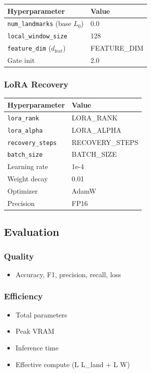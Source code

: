 \begin{table}[H]
\centering
\small
\begin{tabular}{ll}
\toprule
\textbf{Hyperparameter} & \textbf{Value} \\
\midrule
\texttt{num\_landmarks} (base $L_0$) & 0.0 \\
\texttt{local\_window\_size} & 128 \\
\texttt{feature\_dim} ($d_\text{feat}$) & {{FEATURE\_DIM}} \\
Gate init & 2.0 \\
\bottomrule
\end{tabular}
\end{table}

\subsubsection{LoRA Recovery}

\begin{table}[H]
\centering
\small
\begin{tabular}{ll}
\toprule
\textbf{Hyperparameter} & \textbf{Value} \\
\midrule
\texttt{lora\_rank} & {{LORA\_RANK}} \\
\texttt{lora\_alpha} & {{LORA\_ALPHA}} \\
\texttt{recovery\_steps} & {{RECOVERY\_STEPS}} \\
\texttt{batch\_size} & {{BATCH\_SIZE}} \\
Learning rate & 1e-4 \\
Weight decay & 0.01 \\
Optimizer & AdamW \\
Precision & FP16 \\
\bottomrule
\end{tabular}
\end{table}

\subsection{Evaluation}

\subsubsection{Quality}
\begin{itemize}
\item Accuracy, F1, precision, recall, loss

\end{itemize}
\subsubsection{Efficiency}
\begin{itemize}
\item Total parameters
\item Peak VRAM
\item Inference time
\item Effective compute (L   L\_land + L   W)

\end{itemize}

